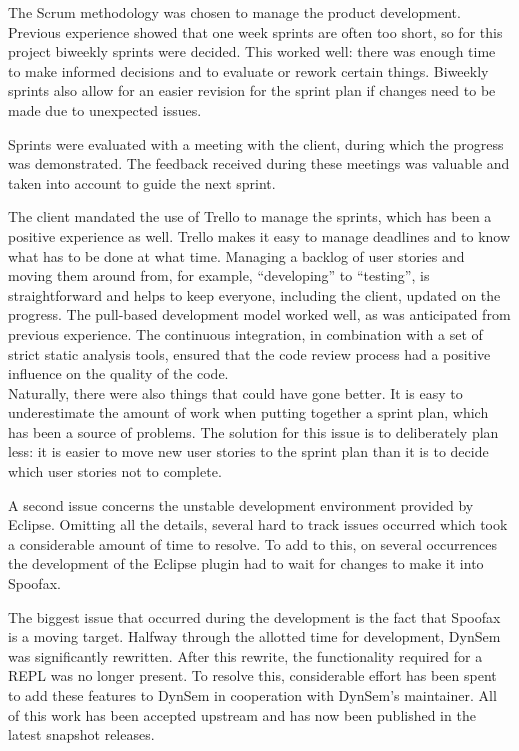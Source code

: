 The Scrum methodology was chosen to manage the product development. Previous
experience showed that one week sprints are often too short, so for this project
biweekly sprints were decided. This worked well: there was enough time to make
informed decisions and to evaluate or rework certain things. Biweekly sprints
also allow for an easier revision for the sprint plan if changes need to be
made due to unexpected issues.

Sprints were evaluated with a meeting with the client, during which the progress
was demonstrated. The feedback received during these meetings was valuable and taken
into account to guide the next sprint.

The client mandated the use of Trello to manage the sprints, which has been a
positive experience as well. Trello makes it easy to manage deadlines and to
know what has to be done at what time. Managing a backlog of user stories and
moving them around from, for example, ``developing'' to ``testing'', is
straightforward and helps to keep everyone, including the client, updated on the
progress.
The pull-based development model worked well, as was anticipated from previous
experience. The continuous integration, in combination with a set of strict
static analysis tools, ensured that the code review process had a positive
influence on the quality of the code.\\

Naturally, there were also things that could have gone better. It is easy to
underestimate the amount of work when putting together a sprint plan, which has
been a source of problems. The solution for this issue is to deliberately plan
less: it is easier to move new user stories to the sprint plan than it is to
decide which user stories not to complete.

A second issue concerns the unstable development environment provided by Eclipse.
Omitting all the details, several hard to track issues occurred which took a
considerable amount of time to resolve. To add to this, on several occurrences
the development of the Eclipse plugin had to wait for changes to make it into
Spoofax.

The biggest issue that occurred during the development is the fact that Spoofax
is a moving target. Halfway through the allotted time for development, DynSem
was significantly rewritten. After this rewrite, the functionality required for
a REPL was no longer present. To resolve this, considerable effort has been spent
to add these features to DynSem in cooperation with DynSem's maintainer. All of
this work has been accepted upstream and has now been published in the latest
snapshot releases.\\

